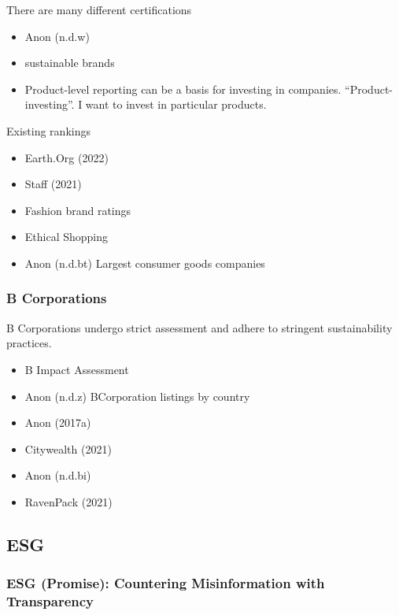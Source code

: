 \documentclass[
  letterpaper,
  DIV=11,
  numbers=noendperiod]{scrartcl}
\providecommand{\tightlist}{%
  \setlength{\itemsep}{0pt}\setlength{\parskip}{0pt}}\usepackage{longtable,booktabs,array}
\begin{document}
There are many different certifications

\begin{itemize}
\item
  Anon (n.d.w)
\item
  sustainable brands
\item
  Product-level reporting can be a basis for investing in companies.
  ``Product-investing''. I want to invest in particular products.
\end{itemize}

Existing rankings

\begin{itemize}
\tightlist
\item
  Earth.Org (2022)
\item
  Staff (2021)
\item
  Fashion brand ratings
\item
  Ethical Shopping
\item
  Anon (n.d.bt) Largest consumer goods companies
\end{itemize}

\subsubsection{B Corporations}\label{b-corporations}

B Corporations undergo strict assessment and adhere to stringent
sustainability practices.

\begin{itemize}
\item
  B Impact Assessment
\item
  Anon (n.d.z) BCorporation listings by country
\item
  Anon (2017a)
\item
  Citywealth (2021)
\item
  Anon (n.d.bi)
\item
  RavenPack (2021)
\end{itemize}

\subsection{ESG}\label{esg}

\subsubsection{ESG (Promise): Countering Misinformation with
Transparency}\label{esg-promise-countering-misinformation-with-transparency}
\end{document}
